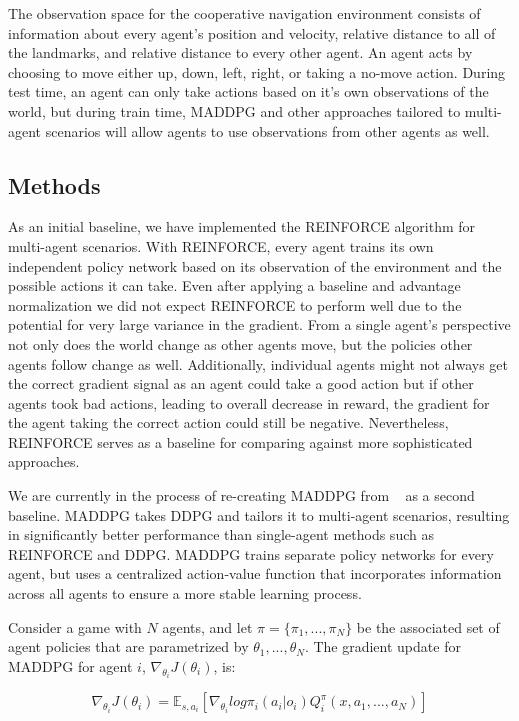 \documentclass{article}
\begin{document}
The observation space for the cooperative navigation environment consists of information about every agent's position and velocity, relative distance to all of the landmarks, and relative distance to every other agent. An agent acts by choosing to move either up, down, left, right, or taking a no-move action. During test time, an agent can only take actions based on it's own observations of the world, but during train time, MADDPG and other approaches tailored to multi-agent scenarios will allow agents to use observations from other agents as well.

\subsection{Methods}
As an initial baseline, we have implemented the REINFORCE algorithm for multi-agent scenarios. With REINFORCE, every agent trains its own independent policy network based on its observation of the environment and the possible actions it can take. Even after applying a baseline and advantage normalization we did not expect REINFORCE to perform well due to the potential for very large variance in the gradient. From a single agent's perspective not only does the world change as other agents move, but the policies other agents follow change as well. Additionally, individual agents might not always get the correct gradient signal as an agent could take a good action but if other agents took bad actions, leading to overall decrease in reward, the gradient for the agent taking the correct action could still be negative. Nevertheless, REINFORCE serves as a baseline for comparing against more sophisticated approaches.

We are currently in the process of re-creating MADDPG from ~\cite{maddpg} as a second baseline. MADDPG takes DDPG and tailors it to multi-agent scenarios, resulting in significantly better performance than single-agent methods such as REINFORCE and DDPG. MADDPG trains separate policy networks for every agent, but uses a centralized action-value function that incorporates information across all agents to ensure a more stable learning process. 

Consider a game with $N$ agents, and let $\pi = \{\pi_1, ..., \pi_N\}$ be the associated set of agent policies that are parametrized by $\theta_1, ..., \theta_N$. The gradient update for MADDPG for agent $i$, $\nabla_{\theta_i} J(\theta_i)$, is:

$$\nabla_{\theta_i}J(\theta_i) = \mathbb{E}_{s, a_i}[\nabla_{\theta_i}log \pi_i(a_i|o_i)Q^{\pi}_i(x, a_1, ..., a_N)]$$
\end{document}
